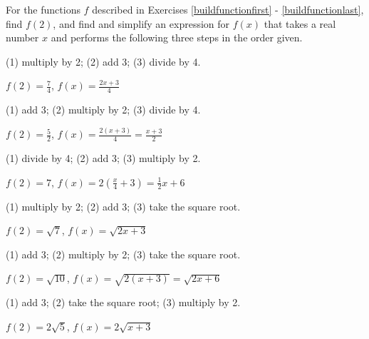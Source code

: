\documentclass{ximera}
\begin{document}
\begin{question}

For the functions $f$ described in Exercises \ref{buildfunctionfirst} - \ref{buildfunctionlast}, find $f(2)$, and find and simplify an expression for $f(x)$ that takes a real number $x$ and performs the following three steps in the order given.


\begin{problem}\label{buildfunctionfirst}
(1) multiply by 2; (2) add 3; (3) divide by 4. 

\begin{solution}
$f(2) = \frac{7}{4}$, $f(x) = \frac{2x+3}{4}$
\end{solution}
\end{problem}


\begin{problem}
(1) add 3; (2) multiply by 2; (3) divide by 4. 

\begin{solution}
$f(2) = \frac{5}{2}$, $f(x) = \frac{2(x+3)}{4} = \frac{x+3}{2}$ 
\end{solution}
\end{problem}

\begin{problem}
(1) divide by 4; (2) add 3; (3) multiply by 2.

\begin{solution}
$f(2) = 7$, $f(x) = 2\left(\frac{x}{4} + 3\right) = \frac{1}{2} x + 6$  
\end{solution}
\end{problem}


\begin{problem}
(1) multiply by 2; (2) add 3; (3) take the square root.

\begin{solution}
$f(2) = \sqrt{7}$, $f(x) = \sqrt{2x+3}$ 
\end{solution}
\end{problem}


\begin{problem}
(1) add 3; (2) multiply by 2; (3) take the square root.

\begin{solution}
$f(2) = \sqrt{10}$, $f(x) = \sqrt{2(x+3)} = \sqrt{2x+6}$
\end{solution}
\end{problem}

\begin{problem}\label{buildfunctionlast}
(1) add 3; (2) take the square root; (3) multiply by 2.

\begin{solution}
$f(2) = 2 \sqrt{5}$, $f(x) = 2\sqrt{x+3}$
\end{solution}
\end{problem}
    
\end{question}
\end{document}
